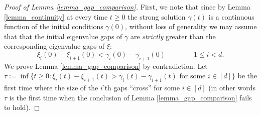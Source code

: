 \documentclass[11pt,letterpaper]{article}
\begin{document}
\begin{proof}[Proof of Lemma \ref{lemma_gap_comparison}]
%
First, we note that since by Lemma \ref{lemma_continuity} at every time $t \geq 0$ the strong solution $\gamma(t)$ is a continuous function of the initial conditions $\gamma(0)$, without loss of generality we may assume that that the initial eigenvalue gaps of $\gamma$ are {\em strictly} greater than the corresponding eigenvalue gaps of $\xi$:
%
\begin{equation}\label{eq_initial_gaps}
    \xi_i(0) - \xi_{i+1}(0)  < \gamma_i(0) - \gamma_{i+1}(0) \qquad \qquad 1\leq i < d.
\end{equation}
%
We prove Lemma \ref{lemma_gap_comparison} by contradiction.
%
%
Let $\tau := \inf\{t\geq 0: \xi_i(t) - \xi_{i+1}(t) > \gamma_i(t) - \gamma_{i+1}(t) \textrm{ for some } i \in [d]  \}$ be the first time where the size of the $i$'th gaps ``cross'' for some $i \in [d]$ (in other words $\tau$ is the first time when the conclusion of Lemma \ref{lemma_gap_comparison} fails to hold).


\end{proof}
\end{document}

